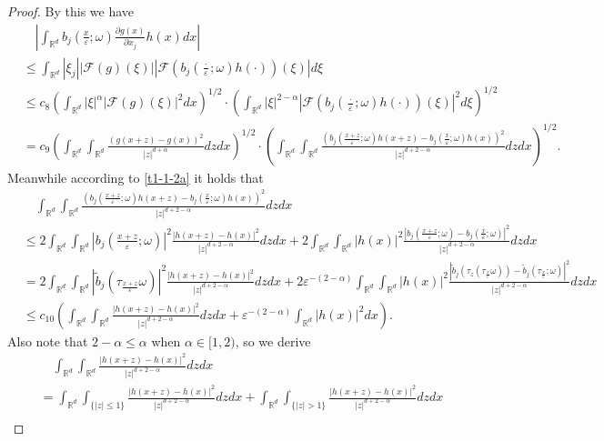 \documentclass[11pt,draft, reqno]{amsart}
\renewcommand{\le}{\leqslant}
\newcommand{\F}{\mathscr{F}}
\newcommand{\R}{\mathds R}
\newcommand{\e}{\varepsilon}
\newcommand{\w}{\omega}
\theoremstyle{definition}
\numberwithin{equation}{section}
\begin{document}
\begin{proof}
By this we have
\begin{equation}\label{t1-1-7}
\begin{split}
&\quad\left|\int_{\R^d} b_j\left(\frac{x}{\e};\w\right)\frac{\partial g(x)}{\partial x_j} h(x)dx\right|\\
&\le
\int_{\R^d}|\xi_j|\left|\F(g)(\xi)\right|\left|\F\left(b_j\left(\frac{\cdot}{\e};\w\right)h(\cdot)\right)(\xi)\right|d\xi\\
&\le c_8\left(\int_{\R^d}|\xi|^\alpha\left|\F(g)(\xi)\right|^2dx\right)^{1/2}\cdot\left(\int_{\R^d}|\xi|^{2-\alpha}
\left|\F\left(b_j\left(\frac{\cdot}{\e};\w\right)h(\cdot)\right)(\xi)\right|^2 d\xi\right)^{1/2}\\
&=c_9\left(\int_{\R^d}\int_{\R^d}\frac{(g(x+z)-g(x))^2}{|z|^{d+\alpha}}dzdx\right)^{1/2}\cdot
\left(\int_{\R^d}\int_{\R^d}\frac{(b_j\left(\frac{x+z}{\e};\w\right)h(x+z)-b_j\left(\frac{x}{\e};\w\right)h(x))^2}{|z|^{d+2-\alpha}}dzdx\right)^{1/2}.
\end{split}
\end{equation}
Meanwhile according to \eqref{t1-1-2a} it holds that
\begin{align*}
&\quad\int_{\R^d}\int_{\R^d}\frac{\left(b_j\left(\frac{x+z}{\e};\w\right)h(x+z)-b_j\left(\frac{x}{\e};\w\right)h(x)\right)^2}{|z|^{d+2-\alpha}}dzdx\\
&\le 2\int_{\R^d}\int_{\R^d}\left|b_j\left(\frac{x+z}{\e};\w\right)\right|^2\frac{\left|h(x+z)-h(x)\right|^2}{|z|^{d+2-\alpha}}dzdx+
2\int_{\R^d}\int_{\R^d}|h(x)|^2\frac{\left|b_j\left(\frac{x+z}{\e};\w\right)-b_j\left(\frac{x}{\e};\w\right)\right|^2}{|z|^{d+2-\alpha}}dzdx\\
&=2\int_{\R^d}\int_{\R^d}\left|\tilde b_j(\tau_{\frac{x+z}{\e}}\w)\right|^2\frac{\left|h(x+z)-h(x)\right|^2}{|z|^{d+2-\alpha}}dzdx+
2\e^{-(2-\alpha)}\int_{\R^d}\int_{\R^d}|h(x)|^2
\frac{\left|\tilde b_j\left(\tau_z(\tau_{\frac{x}{\e}}\w)\right)-\tilde b_j\left(\tau_{\frac{x}{\e}};\w\right)\right|^2}{|z|^{d+2-\alpha}}dzdx\\
&\le c_{10}\left(\int_{\R^d}\int_{\R^d}\frac{\left|h(x+z)-h(x)\right|^2}{|z|^{d+2-\alpha}}dzdx+\e^{-(2-\alpha)}\int_{\R^d}|h(x)|^2dx\right).
\end{align*}
Also note that $2-\alpha\le \alpha$ when $\alpha\in [1,2)$, so we derive
\begin{align*}
&\quad\int_{\R^d}\int_{\R^d}\frac{\left|h(x+z)-h(x)\right|^2}{|z|^{d+2-\alpha}}dzdx\\
&=\int_{\R^d}\int_{\{|z|\le 1\}}\frac{\left|h(x+z)-h(x)\right|^2}{|z|^{d+2-\alpha}}dzdx+
\int_{\R^d}\int_{\{|z|> 1\}}\frac{\left|h(x+z)-h(x)\right|^2}{|z|^{d+2-\alpha}}dzdx\\

\end{align*}
\end{proof}
\end{document}
